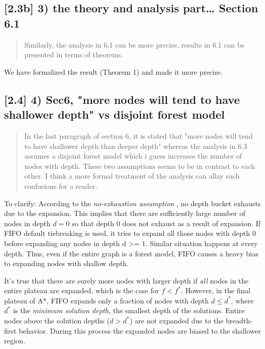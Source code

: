 \documentclass{article}
\begin{document}
\subsection{[2.3b] 3) the theory and analysis part\ldots{} Section 6.1}
\label{sec:orgheadline17}

\begin{quote}
Similarly, the analysis in 6.1 can be more
precise, results in 6.1 can be presented in terms of theorems.
\end{quote}

We have formalized the result (Theorem 1) and made it more precise.

\subsection{[2.4] 4) Sec6, "more nodes will tend to have shallower depth" vs disjoint forest model}
\label{sec:orgheadline18}

\begin{quote}
 In the last paragraph of section 6, it is stated that "more nodes
will tend to have shallower depth than deeper depth" whereas the
analysis in 6.3 assumes a disjoint forest model which i guess
increases the number of nodes with depth. These two assumptions seems
to be in contrast to each other. I think a more formal treatment of
the analysis can allay such confusions for a reader.
\end{quote}

To clarify: According to the \emph{no-exhaustion assumption} , no depth bucket exhausts due to the expansion.
This implies that there are sufficiently large number of nodes in depth \(d=0\) so that
 depth 0 does not exhaust as a result of expansion.
If FIFO default tiebreaking is used,
it tries to expand all those nodes with depth 0 before expanding any nodes in depth d >= 1.
Similar situation happens at every depth.
Thus, even if the entire graph is a forest model, FIFO causes a heavy bias to expanding nodes with shallow depth.

It's true that there are surely more nodes with larger depth if \emph{all} nodes in the entire plateau are expanded, which is the case for \(f<f^*\).
However, in the final plateau of A*, FIFO expands only a fraction of nodes with depth \(d\leq d^*\),
where \(d^*\) is the \emph{minimum solution depth}, the smallest depth of the solutions.
Entire nodes above the solution depths (\(d>d^*\)) are not expanded due to the breadth-first behavior.
During this process the expanded nodes are biased to the shallower region.
\end{document}
